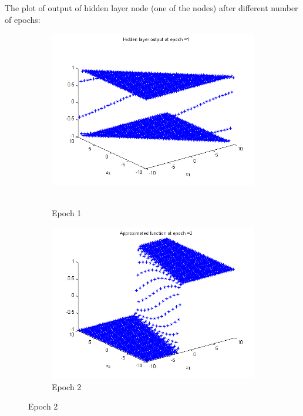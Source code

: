 \documentclass{article}
\begin{document}
The plot of output of hidden layer node (one of the nodes) after different number of epochs:

\begin{figure}
\begin{subfigure}{.5\textwidth}
  \centering
  \includegraphics[width=.8\linewidth]{Regression/bivariate/hidden_1layer_1.png}\
  \caption{Epoch 1}
\end{subfigure}%
\begin{subfigure}{.5\textwidth}
  \centering
  \includegraphics[width=.8\linewidth]{Regression/bivariate/hidden_1layer_2.png}
   \caption{Epoch 2}
  \end{subfigure}
  

\end{figure}
\end{document}
